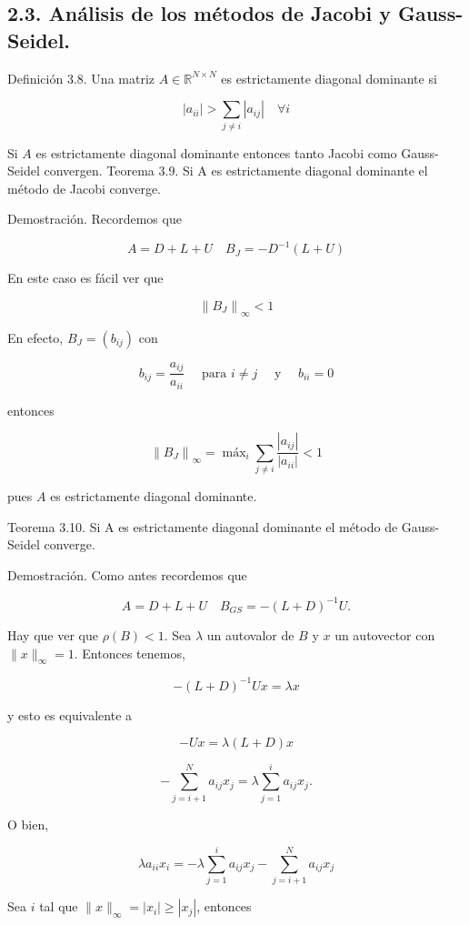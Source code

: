 \documentclass[10pt]{article}
\begin{document}
\subsection*{2.3. Análisis de los métodos de Jacobi y Gauss-Seidel.}
Definición 3.8. Una matriz $A \in \mathbb{R}^{N \times N}$ es estrictamente diagonal dominante si

$$
\left|a_{i i}\right|>\sum_{j \neq i}\left|a_{i j}\right| \quad \forall i
$$

Si $A$ es estrictamente diagonal dominante entonces tanto Jacobi como Gauss-Seidel convergen. Teorema 3.9. Si A es estrictamente diagonal dominante el método de Jacobi converge.

Demostración. Recordemos que

$$
A=D+L+U \quad B_{J}=-D^{-1}(L+U)
$$

En este caso es fácil ver que

$$
\left\|B_{J}\right\|_{\infty}<1
$$

En efecto, $B_{J}=\left(b_{i j}\right)$ con

$$
b_{i j}=\frac{a_{i j}}{a_{i i}} \quad \text { para } i \neq j \quad \text { y } \quad b_{i i}=0
$$

entonces

$$
\left\|B_{J}\right\|_{\infty}=\operatorname{máx}_{i} \sum_{j \neq i} \frac{\left|a_{i j}\right|}{\left|a_{i i}\right|}<1
$$

pues $A$ es estrictamente diagonal dominante.

Teorema 3.10. Si A es estrictamente diagonal dominante el método de Gauss-Seidel converge.

Demostración. Como antes recordemos que

$$
A=D+L+U \quad B_{G S}=-(L+D)^{-1} U .
$$

Hay que ver que $\rho(B)<1$. Sea $\lambda$ un autovalor de $B$ y $x$ un autovector con $\|x\|_{\infty}=1$. Entonces tenemos,

$$
-(L+D)^{-1} U x=\lambda x
$$

y esto es equivalente a

$$
-U x=\lambda(L+D) x
$$

$$
-\sum_{j=i+1}^{N} a_{i j} x_{j}=\lambda \sum_{j=1}^{i} a_{i j} x_{j} .
$$

O bien,

$$
\lambda a_{i i} x_{i}=-\lambda \sum_{j=1}^{i} a_{i j} x_{j}-\sum_{j=i+1}^{N} a_{i j} x_{j}
$$

Sea $i$ tal que $\|x\|_{\infty}=\left|x_{i}\right| \geq\left|x_{j}\right|$, entonces
\end{document}
